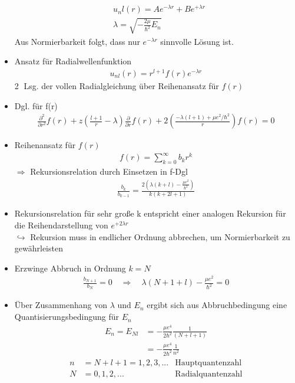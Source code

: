\documentclass[10pt,article,colorback,accentcolor=tud9d]{scrartcl}
\begin{document}
\begin{itemize}
\begin{align}
    &u_nl(r)=Ae^{-\lambda r}+Be^{+\lambda r}\\
    &\lambda=\sqrt{-\frac{2\mu}{\hbar^2}E_n}
    \end{align}
    Aus Normierbarkeit folgt, dass nur $e^{-\lambda r}$ sinnvolle Lösung ist.
  \item Ansatz für Radialwellenfunktion
    \begin{align}
    u_{nl}(r)=r^{l+1}f(r)e^{-\lambda r}
    \end{align}
    \textcircled{2} Lsg. der vollen Radialgleichung über Reihenansatz für $f(r)$
  \item Dgl. für f(r)
    \begin{align}
    \frac{\partial^2}{\partial r^2}f(r)+z\left(\frac{l+1}{r}-\lambda\right)\frac{\partial}{\partial r}f(r)+2\left(\frac{-\lambda(l+1)+\mu e^2/\hbar^2}{r}\right)f(r)=0
    \end{align}
  \item Reihenansatz für $f(r)$
    \begin{align}
    f(r)=\sum^\infty_{k=0}b_kr^k
    \end{align}
    $\Rightarrow$ Rekursionsrelation durch Einsetzen in f-Dgl
    \begin{align}
    \frac{b_k}{b_{k-1}}=\frac{2\left(\lambda(k+l)-\frac{\mu e^2}{\hbar^2}\right)}{k(k+2l+1)}
    \end{align}
  \item Rekursionsrelation für sehr große k entspricht einer analogen Rekursion für die Reihendarstellung von $e^{+2\lambda r}$\\
    $\hookrightarrow$ Rekursion muss in endlicher Ordnung abbrechen, um Normierbarkeit zu gewährleisten
  \item Erzwinge Abbruch in Ordnung $k=N$
    \begin{align}
    \frac{b_{N+1}}{b_N}=0\quad \Rightarrow\quad \lambda(N+1+l)-\frac{\mu e^2}{\hbar^2}=0
    \end{align}
  \item Über Zusammenhang von $\lambda$ und $E_n$ ergibt sich aus Abbruchbedingung eine Quantisierungsbedingung für $E_n$ 
    \begin{align}
    E_n=E_{Nl}&=-\frac{\mu e^4}{2\hbar^2}\frac{1}{(N+l+1)}\\
    &=-\frac{\mu e^4}{2\hbar^2}\frac{1}{n^2}
    \end{align}
    \begin{align}
    n&=N+l+1=1,2,3,...&\text{Hauptquantenzahl}\\
    N&=0,1,2,...&\text{Radialquantenzahl}\\

\end{align}
\end{itemize}
\end{document}
